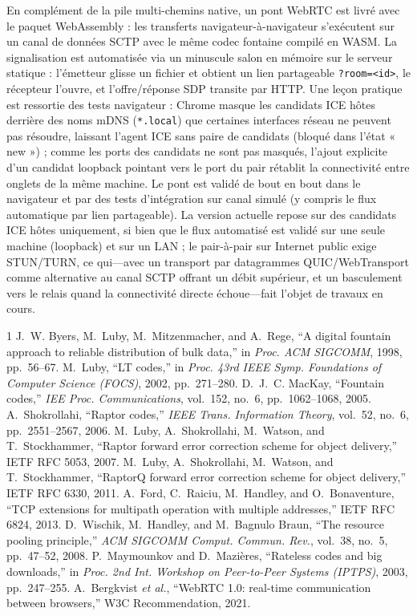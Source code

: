\documentclass[conference]{IEEEtran}
\begin{document}
En complément de la pile multi-chemins native, un pont WebRTC est livré avec le
paquet WebAssembly : les transferts navigateur-à-navigateur s'exécutent sur un
canal de données SCTP avec le même codec fontaine compilé en WASM. La
signalisation est automatisée via un minuscule salon en mémoire sur le serveur
statique : l'émetteur glisse un fichier et obtient un lien partageable
\texttt{?room=<id>}, le récepteur l'ouvre, et l'offre/réponse SDP transite par
HTTP. Une leçon pratique est ressortie
des tests navigateur : Chrome masque les candidats ICE hôtes derrière des noms
mDNS (\texttt{*.local}) que certaines interfaces réseau ne peuvent pas
résoudre, laissant l'agent ICE sans paire de candidats (bloqué dans l'état
« new ») ; comme les ports des candidats ne sont pas masqués, l'ajout explicite
d'un candidat loopback pointant vers le port du pair rétablit la connectivité
entre onglets de la même machine. Le pont est validé de bout en bout dans le
navigateur et par des tests d'intégration sur canal simulé (y compris le flux
automatique par lien partageable). La version actuelle repose sur des candidats
ICE hôtes uniquement, si bien que le flux automatisé est validé sur une seule
machine (loopback) et sur un LAN ; le pair-à-pair sur Internet public exige
STUN/TURN, ce qui---avec un transport par datagrammes QUIC/WebTransport comme
alternative au canal SCTP offrant un débit supérieur, et un basculement vers le
relais quand la connectivité directe échoue---fait l'objet de travaux en cours.

\begin{thebibliography}{1}
J.~W. Byers, M.~Luby, M.~Mitzenmacher, and A.~Rege, ``A digital fountain approach
to reliable distribution of bulk data,'' in \emph{Proc. ACM SIGCOMM}, 1998,
pp.~56--67.
M.~Luby, ``LT codes,'' in \emph{Proc. 43rd IEEE Symp. Foundations of Computer
Science (FOCS)}, 2002, pp.~271--280.
D.~J.~C. MacKay, ``Fountain codes,'' \emph{IEE Proc. Communications},
vol.~152, no.~6, pp.~1062--1068, 2005.
A.~Shokrollahi, ``Raptor codes,'' \emph{IEEE Trans. Information Theory},
vol.~52, no.~6, pp.~2551--2567, 2006.
M.~Luby, A.~Shokrollahi, M.~Watson, and T.~Stockhammer, ``Raptor forward error
correction scheme for object delivery,'' IETF RFC 5053, 2007.
M.~Luby, A.~Shokrollahi, M.~Watson, and T.~Stockhammer, ``RaptorQ forward error
correction scheme for object delivery,'' IETF RFC 6330, 2011.
A.~Ford, C.~Raiciu, M.~Handley, and O.~Bonaventure, ``TCP extensions for
multipath operation with multiple addresses,'' IETF RFC 6824, 2013.
D.~Wischik, M.~Handley, and M.~Bagnulo Braun, ``The resource pooling
principle,'' \emph{ACM SIGCOMM Comput. Commun. Rev.}, vol.~38, no.~5,
pp.~47--52, 2008.
P.~Maymounkov and D.~Mazi{\`e}res, ``Rateless codes and big downloads,'' in
\emph{Proc. 2nd Int. Workshop on Peer-to-Peer Systems (IPTPS)}, 2003,
pp.~247--255.
A.~Bergkvist \emph{et al.}, ``WebRTC 1.0: real-time communication between
browsers,'' W3C Recommendation, 2021.
\end{thebibliography}
\end{document}
